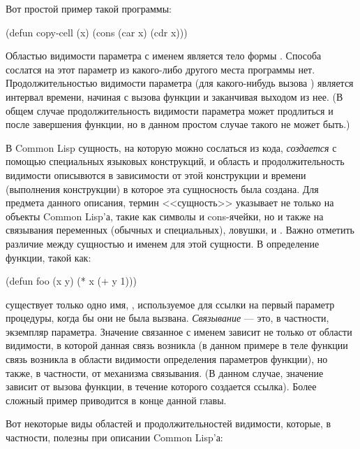 Вот простой пример такой программы:
\begin{lisp}
(defun copy-cell (x) (cons (car x) (cdr x)))
\end{lisp}

Областью видимости параметра с именем  является тело формы .
Способа сослатся на этот параметр из какого-либо другого места программы
нет. Продолжительностью видимости параметра  (для какого-нибудь вызова
) является интервал времени, начиная с вызова функции и заканчивая
выходом из нее. (В общем случае продолжительность видимости параметра может
продлиться и после завершения функции, но в данном простом случае такого не
может быть.) 

В Common Lisp сущность, на которую можно сослаться из кода, \emph{создается} с
помощью специальных языковых конструкций, и область и продолжительность
видимости описывются в зависимости от этой конструкции и времени (выполнения
конструкции) в которое эта сущносность была создана.
Для предмета данного описания, термин <<сущность>> указывает не только на
объекты Common Lisp'а, такие как символы и cons-ячейки, но и также на связывания
переменных (обычных и специальных), ловушки, и . Важно
отметить различие между сущностью и именем для этой сущности. В определение
функции, такой как:

\begin{lisp}
(defun foo (x y) (* x (+ y 1)))
\end{lisp}

существует только одно имя, , используемое для ссылки на первый параметр
процедуры, когда бы они не была вызвана. \emph{Связывание} --- это, в частности,
экземпляр параметра. Значение связанное с именем  зависит не только от
области видимости, в которой данная связь возникла (в данном примере в теле
функции  связь возникла в области видимости определения параметров
функции), но также, в частности, от механизма связывания. (В данном случае,
значение зависит от вызова функции, в течение которого создается ссылка). Более
сложный пример приводится в конце данной главы. 

Вот некоторые виды областей и продолжительностей видимости, которые, в частности,
полезны при описании Common Lisp'а:

